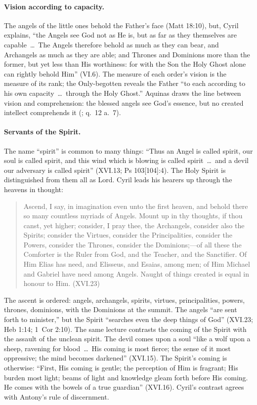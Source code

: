 \paragraph{Vision according to capacity.} The angels of the little ones
behold the Father's face (Matt 18:10), but, Cyril explains, ``the Angels
see God not as He is, but as far as they themselves are capable~\dots\
The Angels therefore behold as much as they can bear, and Archangels as
much as they are able; and Thrones and Dominions more than the former,
but yet less than His worthiness: for with the Son the Holy Ghost alone
can rightly behold Him'' (VI.6). The measure of each order's vision is
the measure of its rank; the Only-begotten reveals the Father ``to each
according to his own capacity~\dots\ through the Holy Ghost.'' Aquinas
draws the line between vision and comprehension: the blessed angels see
God's essence, but no created intellect comprehends it (;
q.~12 a.~7).

\paragraph{Servants of the Spirit.} The name ``spirit'' is common to
many things: ``Thus an Angel is called spirit, our soul is called spirit,
and this wind which is blowing is called spirit~\dots\ and a devil our
adversary is called spirit'' (XVI.13; Ps 103[104]:4). The Holy Spirit
is distinguished from them all as Lord. Cyril leads his hearers up
through the heavens in thought:

\begin{quote}
Ascend, I say, in imagination even unto the first heaven, and behold
there so many countless myriads of Angels. Mount up in thy thoughts, if
thou canst, yet higher; consider, I pray thee, the Archangels, consider
also the Spirits; consider the Virtues, consider the Principalities,
consider the Powers, consider the Thrones, consider the Dominions;---of
all these the Comforter is the Ruler from God, and the Teacher, and the
Sanctifier. Of Him Elias has need, and Elisseus, and Esaias, among men;
of Him Michael and Gabriel have need among Angels. Naught of things
created is equal in honour to Him. (XVI.23)
\end{quote}

\noindent The ascent is ordered: angels, archangels, spirits, virtues,
principalities, powers, thrones, dominions, with the Dominions at the
summit. The angels ``are sent forth to minister,'' but the Spirit
``searches even the deep things of God'' (XVI.23; Heb 1:14; 1~Cor 2:10).
The same lecture contrasts the coming of the Spirit with the assault of
the unclean spirit. The devil comes upon a soul ``like a wolf upon a
sheep, ravening for blood~\dots\ His coming is most fierce; the sense of
it most oppressive; the mind becomes darkened'' (XVI.15). The Spirit's
coming is otherwise: ``First, His coming is gentle; the perception of
Him is fragrant; His burden most light; beams of light and knowledge
gleam forth before His coming. He comes with the bowels of a true
guardian'' (XVI.16). Cyril's contrast agrees with Antony's rule of
discernment.

